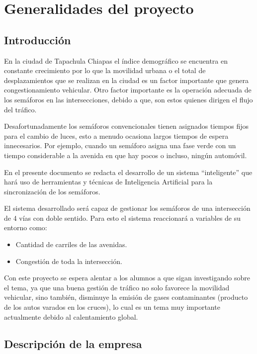 \chapter{Generalidades del proyecto}
\section{Introducción}

En la ciudad de Tapachula Chiapas el índice demográfico se encuentra en constante crecimiento por lo que la movilidad urbana o el total de desplazamientos que se realizan en la ciudad es un factor importante que genera congestionamiento vehicular. Otro factor importante es la operación adecuada de los semáforos en las intersecciones, debido a que, son estos quienes dirigen el flujo del tráfico.

Desafortunadamente los semáforos convencionales tienen asignados tiempos fijos para el cambio de luces, esto a menudo ocasiona largos tiempos de espera innecesarios. Por ejemplo, cuando un semáforo asigna una fase verde con un tiempo considerable a la avenida en que hay pocos o incluso, ningún automóvil.

En el presente documento se redacta el desarrollo de un sistema “inteligente” que hará uso de herramientas y técnicas de Inteligencia Artificial para la sincronización de los semáforos.

El sistema desarrollado será capaz de gestionar los semáforos de una intersección de 4 vías con doble sentido. Para esto el sistema reaccionará a variables de su entorno como:

{\setlength{\baselineskip}{0.7\baselineskip}
\begin{itemize}
	\item Cantidad de carriles de las avenidas.
	\item Congestión de toda la intersección.
\end{itemize}}

Con este proyecto se espera alentar a los alumnos a que sigan investigando sobre el tema, ya que una buena gestión de tráfico no solo favorece la movilidad vehicular, sino también, disminuye la emisión de gases contaminantes (producto de los autos varados en los cruces), lo cual es un tema muy importante actualmente debido al calentamiento global.

\section{Descripción de la empresa}

